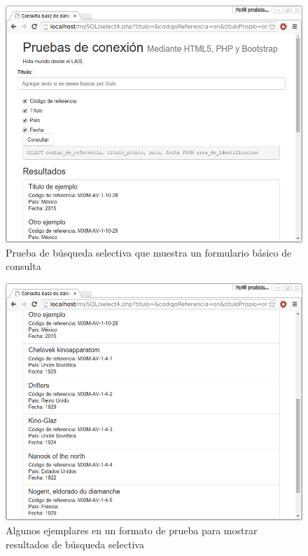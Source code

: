 \documentclass[10pt,letterpaper]{article}
\begin{document}
\begin{figure}[H]
	\centering
	\includegraphics[keepaspectratio=true,width=\linewidth]{Prototipo_02.png}
	\caption{Prueba de búsqueda selectiva que muestra un formulario básico de consulta}
	\label{fig:prueba_formulario}
\end{figure}

\begin{figure}[H]
	\centering
	\includegraphics[keepaspectratio=true,width=\linewidth]{Prototipo_03.png}
	\caption{Algunos ejemplares en un formato de prueba para mostrar resultados de búsqueda selectiva}
	\label{fig:prueba_formulario_2}
\end{figure}
\end{document}
